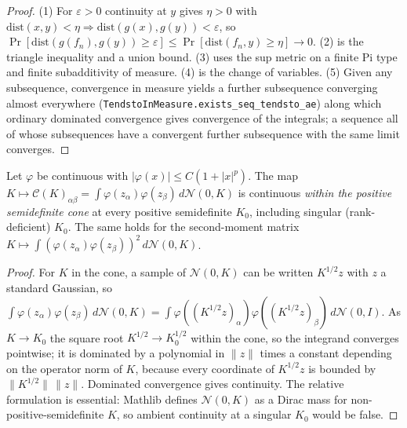 \begin{proof}
  \leanok
(1) For $\varepsilon>0$ continuity at $y$ gives $\eta>0$ with $\mathrm{dist}(x,y)<\eta\Rightarrow\mathrm{dist}(g(x),g(y))<\varepsilon$, so $\Pr[\mathrm{dist}(g(f_n),g(y))\ge\varepsilon]\le\Pr[\mathrm{dist}(f_n,y)\ge\eta]\to0$. (2) is the triangle inequality and a union bound. (3) uses the sup metric on a finite Pi type and finite subadditivity of measure.
(4) is the change of variables. (5) Given any subsequence, convergence in measure yields a further subsequence converging almost everywhere (\texttt{TendstoInMeasure.exists\_seq\_tendsto\_ae}) along which ordinary dominated convergence gives convergence of the integrals; a sequence all of whose subsequences have a convergent further subsequence with the same limit converges.
\end{proof}

\begin{theorem}\label{thm:ntkdeep:covarianceContinuity}
  \leanok
Let $\varphi$ be continuous with $|\varphi(x)|\le C(1+|x|^p)$. The map $K\mapsto\mathcal C(K)_{\alpha\beta}=\int\varphi(z_\alpha)\varphi(z_\beta)\,d\mathcal N(0,K)$ is continuous \emph{within the positive semidefinite cone} at every positive semidefinite $K_0$, including singular (rank-deficient) $K_0$. The same holds for the second-moment matrix
$K\mapsto\int(\varphi(z_\alpha)\varphi(z_\beta))^2\,d\mathcal N(0,K)$.
\end{theorem}

\begin{proof}
  \leanok
For $K$ in the cone, a sample of $\mathcal N(0,K)$ can be written $K^{1/2}z$ with $z$ a standard Gaussian, so $\int\varphi(z_\alpha)\varphi(z_\beta)\,d\mathcal N(0,K)=\int\varphi((K^{1/2}z)_\alpha)\varphi((K^{1/2}z)_\beta)\,d\mathcal N(0,I)$. As $K\to K_0$ the square root $K^{1/2}\to K_0^{1/2}$ within the cone, so the integrand converges pointwise; it is dominated by a polynomial in $\|z\|$ times a constant depending on the operator norm of $K$, because
every coordinate of $K^{1/2}z$ is bounded by $\|K^{1/2}\|\,\|z\|$. Dominated convergence gives continuity. The relative formulation is essential: Mathlib defines $\mathcal N(0,K)$ as a Dirac mass for non-positive-semidefinite $K$, so ambient continuity at a singular $K_0$ would be false.
\end{proof}

